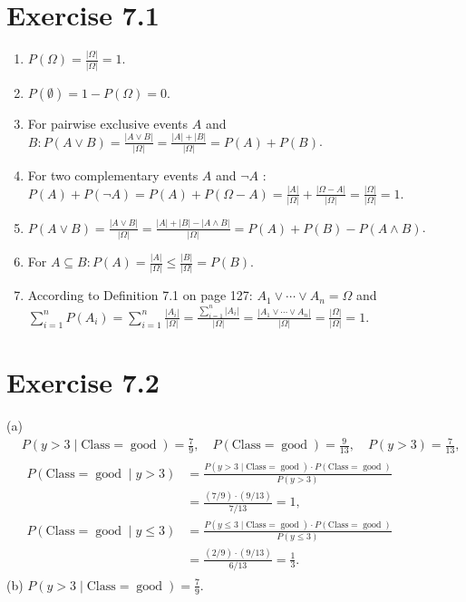 \documentclass[10pt]{book}
\begin{document}
\section{Exercise 7.1}
\begin{enumerate}
  \item $P(\Omega)=\frac{|\Omega|}{|\Omega|}=1$.
  \item $P(\emptyset)=1-P(\Omega)=0$.
  \item For pairwise exclusive events $A$ and $B: P(A \vee B)=\frac{|A \vee B|}{|\Omega|}=\frac{|A|+|B|}{|\Omega|}=P(A)+P(B)$.
  \item For two complementary events $A$ and $\neg A$ : $P(A)+P(\neg A)=P(A)+P(\Omega-A)=\frac{|A|}{|\Omega|}+\frac{|\Omega-A|}{|\Omega|}=\frac{|\Omega|}{|\Omega|}=1$.
  \item $P(A \vee B)=\frac{|A \vee B|}{|\Omega|}=\frac{|A|+|B|-|A \wedge B|}{|\Omega|}=P(A)+P(B)-P(A \wedge B)$.
  \item For $A \subseteq B: P(A)=\frac{|A|}{|\Omega|} \leq \frac{|B|}{|\Omega|}=P(B)$.
  \item According to Definition 7.1 on page 127: $A_{1} \vee \cdots \vee A_{n}=\Omega$ and $\sum_{i=1}^{n} P\left(A_{i}\right)=\sum_{i=1}^{n} \frac{\left|A_{i}\right|}{|\Omega|}=\frac{\sum_{i=1}^{n}\left|A_{i}\right|}{|\Omega|}=\frac{\left|A_{1} \vee \cdots \vee A_{n}\right|}{|\Omega|}=\frac{|\Omega|}{|\Omega|}=1$.
\end{enumerate}
\section{Exercise 7.2}
(a)
\[
\begin{aligned}
& P(y>3 \mid \text{Class}=\operatorname{good})=\frac{7}{9}, \quad P(\text{Class}=\operatorname{good})=\frac{9}{13}, \quad P(y>3)=\frac{7}{13},\\
& \begin{aligned}
P(\text{Class}=\operatorname{good} \mid y>3) & =\frac{P(y>3 \mid \text{Class}=\operatorname{good}) \cdot P(\text{Class}=\operatorname{good})}{P(y>3)} \\
& =\frac{(7/9)\cdot(9/13)}{7/13}=1, \\
P(\text{Class}=\operatorname{good} \mid y \leq 3) & =\frac{P(y \leq 3 \mid \text{Class}=\operatorname{good}) \cdot P(\text{Class}=\operatorname{good})}{P(y \leq 3)} \\
& =\frac{(2/9)\cdot(9/13)}{6/13}=\frac{1}{3} .
\end{aligned}
\end{aligned}
\]
(b) $P(y>3 \mid \text{Class}=\operatorname{good})=\frac{7}{9}$.
\end{document}
